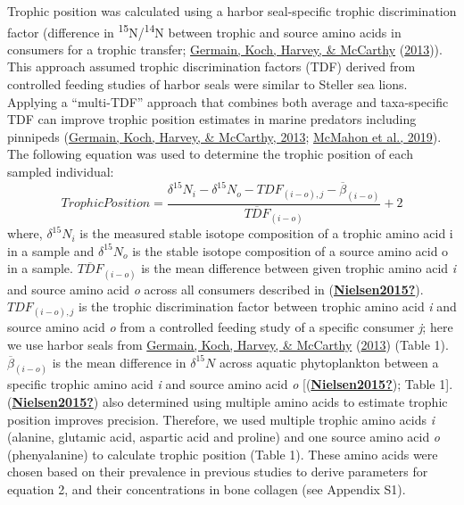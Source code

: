 \documentclass [11pt, proquest] {uwthesis}[2015/03/03]
\begin{document}
Trophic position was calculated using a harbor seal-specific trophic discrimination factor (difference in \textsuperscript{15}N/\textsuperscript{14}N between trophic and source amino acids in consumers for a trophic transfer; \protect\hyperlink{ref-Germain2013}{Germain, Koch, Harvey, \& McCarthy} (\protect\hyperlink{ref-Germain2013}{2013})). This approach assumed trophic discrimination factors (TDF) derived from controlled feeding studies of harbor seals were similar to Steller sea lions. Applying a ``multi-TDF'' approach that combines both average and taxa-specific TDF can improve trophic position estimates in marine predators including pinnipeds (\protect\hyperlink{ref-Germain2013}{Germain, Koch, Harvey, \& McCarthy, 2013}; \protect\hyperlink{ref-McMahon2019}{McMahon et al., 2019}). The following equation was used to determine the trophic position of each sampled individual:
\begin{equation} 
Trophic Position =   
  \frac{\delta^{15}N_i - \delta^{15}N_o - TDF_{(i-o),j} - \overline{\beta}_{(i-o)}}{\overline{TDF}_{(i-o)}}+2
  \label{eq:TP}
\end{equation}
where, \(\delta^{15}N_i\) is the measured stable isotope composition of a trophic amino acid i in a sample and \(\delta^{15}N_o\) is the stable isotope composition of a source amino acid o in a sample. \(\overline{TDF}_{(i-o)}\) is the mean difference between given trophic amino acid \emph{i} and source amino acid \emph{o} across all consumers described in (\protect\hyperlink{ref-Nielsen2015}{\textbf{Nielsen2015?}}). \(TDF_{(i-o), j}\) is the trophic discrimination factor between trophic amino acid \emph{i} and source amino acid \emph{o} from a controlled feeding study of a specific consumer \emph{j}; here we use harbor seals from \protect\hyperlink{ref-Germain2013}{Germain, Koch, Harvey, \& McCarthy} (\protect\hyperlink{ref-Germain2013}{2013}) (Table 1). \(\overline\beta_{(i-o)}\) is the mean difference in \(\delta^{15}N\) across aquatic phytoplankton between a specific trophic amino acid \emph{i} and source amino acid \emph{o} {[}(\protect\hyperlink{ref-Nielsen2015}{\textbf{Nielsen2015?}}); Table 1{]}. (\protect\hyperlink{ref-Nielsen2015}{\textbf{Nielsen2015?}}) also determined using multiple amino acids to estimate trophic position improves precision. Therefore, we used multiple trophic amino acids \emph{i} (alanine, glutamic acid, aspartic acid and proline) and one source amino acid \emph{o} (phenyalanine) to calculate trophic position (Table 1). These amino acids were chosen based on their prevalence in previous studies to derive parameters for equation 2, and their concentrations in bone collagen (see Appendix S1).
\end{document}
